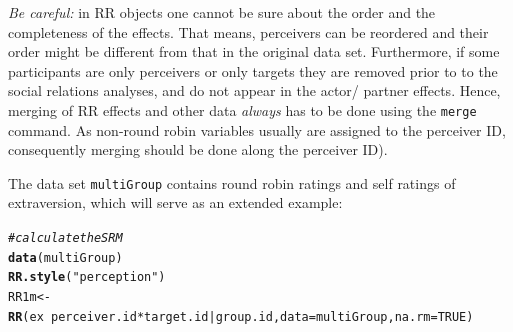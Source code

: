 \documentclass[a4paper]{article}\usepackage[]{graphicx}\usepackage[]{color}
\makeatletter
\newcommand{\hlnum}[1]{\textcolor[rgb]{0.686,0.059,0.569}{#1}}%
\newcommand{\hlstr}[1]{\textcolor[rgb]{0.192,0.494,0.8}{#1}}%
\newcommand{\hlcom}[1]{\textcolor[rgb]{0.678,0.584,0.686}{\textit{#1}}}%
\newcommand{\hlopt}[1]{\textcolor[rgb]{0,0,0}{#1}}%
\newcommand{\hlstd}[1]{\textcolor[rgb]{0.345,0.345,0.345}{#1}}%
\newcommand{\hlkwb}[1]{\textcolor[rgb]{0.69,0.353,0.396}{#1}}%
\newcommand{\hlkwc}[1]{\textcolor[rgb]{0.333,0.667,0.333}{#1}}%
\newcommand{\hlkwd}[1]{\textcolor[rgb]{0.737,0.353,0.396}{\textbf{#1}}}%
\newenvironment{kframe}{%
 \def\at@end@of@kframe{}%
 \ifinner\ifhmode%
  \def\at@end@of@kframe{\end{minipage}}%
  \begin{minipage}{\columnwidth}%
 \fi\fi%
 \def\FrameCommand##1{\hskip\@totalleftmargin \hskip-\fboxsep
 \colorbox{shadecolor}{##1}\hskip-\fboxsep
     \hskip-\linewidth \hskip-\@totalleftmargin \hskip\columnwidth}%
 \MakeFramed {\advance\hsize-\width
   \@totalleftmargin\z@ \linewidth\hsize
   \@setminipage}}%
 {\par\unskip\endMakeFramed%
 \at@end@of@kframe}
\newenvironment{knitrout}{}{} %
\makeatother
\begin{document}
\emph{Be careful:} in RR objects one cannot be sure about the order and the completeness of the effects. That means, perceivers can be reordered and their order might be different from that in the original data set. Furthermore, if some participants are only perceivers or only targets they are removed prior to to the social relations analyses, and do not appear in the actor/ partner effects. Hence, merging of RR effects and other data \emph{always} has to be done using the \texttt{merge} command. As non-round robin variables usually are assigned to the perceiver ID, consequently merging should be done along the perceiver ID).

The data set \texttt{multiGroup} contains round robin ratings and self ratings of extraversion, which will serve as an extended example:

\begin{knitrout}\small
{}\color{fgcolor}\begin{kframe}
\begin{alltt}
\hlcom{# calculate the SRM}
\hlkwd{data}\hlstd{(multiGroup)}
\hlkwd{RR.style}\hlstd{(}\hlstr{"perception"}\hlstd{)}
\hlstd{RR1m} \hlkwb{<-} \hlkwd{RR}\hlstd{(ex} \hlopt{~} \hlstd{perceiver.id} \hlopt{*} \hlstd{target.id} \hlopt{|} \hlstd{group.id,} \hlkwc{data} \hlstd{= multiGroup,} \hlkwc{na.rm} \hlstd{=} \hlnum{TRUE}\hlstd{)}
\end{alltt}


{\ttfamily\noindent\color{warningcolor}{\#\# Warning: ex : \ 4 \ participant(s) have been excluded from group 2 due to exceedingly missing data; id(s) = 90202, 90204, 90208, 90217 .}}

{\ttfamily\noindent\color{warningcolor}{\#\# Warning: ex : \ 3 \ participant(s) have been excluded from group 5 due to exceedingly missing data; id(s) = 90509, 90504, 90521 .}}

{\ttfamily\noindent\color{warningcolor}{\#\# Warning: ex : \ 4 \ participant(s) have been excluded from group 6 due to exceedingly missing data; id(s) = 90606, 90608, 90614, 90616 .}}

{\ttfamily\noindent\color{warningcolor}{\#\# Warning: ex : \ 1 \ participant(s) have been excluded from group 8 due to exceedingly missing data; id(s) = 90811 .}}

{\ttfamily\noindent\color{warningcolor}{\#\# Warning: ex : \ 1 \ participant(s) have been excluded from group 9 due to exceedingly missing data; id(s) = 90918 .}}

{\ttfamily\noindent\color{warningcolor}{\#\# Warning: ex : \ 1 \ participant(s) have been excluded from group 12 due to exceedingly missing data; id(s) = 91213 .}}


\end{kframe}
\end{knitrout}
\end{document}
